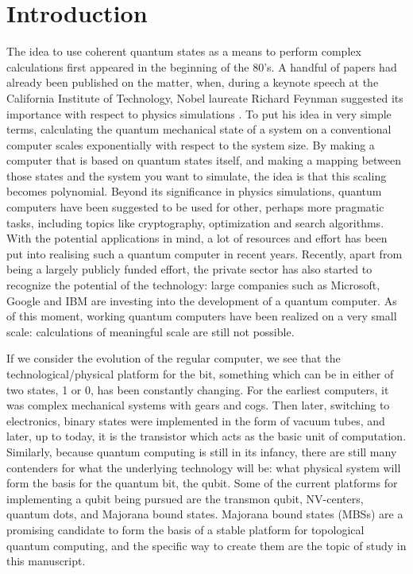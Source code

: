 \chapter{Introduction}

	The idea to use coherent quantum states as a means to perform complex calculations first appeared in the beginning of the 80's.
	A handful of papers had already been published on the matter, when, during a keynote speech at the California Institute of Technology, Nobel laureate Richard Feynman suggested its importance with respect to physics simulations .
	To put his idea in very simple terms, calculating the quantum mechanical state of a system on a conventional computer scales exponentially with respect to the system size.
	By making a computer that is based on quantum states itself, and making a mapping between those states and the system you want to simulate, the idea is that this scaling becomes polynomial.
	Beyond its significance in physics simulations, quantum computers have been suggested to be used for other, perhaps more pragmatic tasks, including topics like cryptography, optimization and search algorithms.
	With the potential applications in mind, a lot of resources and effort has been put into realising such a quantum computer in recent years.
	Recently, apart from being a largely publicly funded effort, the private sector has also started to recognize the potential of the technology: large companies such as Microsoft, Google and IBM are investing into the development of a quantum computer.
	As of this moment, working quantum computers have been realized on a very small scale: calculations of meaningful scale are still not possible.

	If we consider the evolution of the regular computer, we see that the technological/physical platform for the bit, something which can be in either of two states, 1 or 0, has been constantly changing.
	For the earliest computers, it was complex mechanical systems with gears and cogs.
	Then later, switching to electronics, binary states were implemented in the form of vacuum tubes, and later, up to today, it is the transistor which acts as the basic unit of computation.
	Similarly, because quantum computing is still in its infancy, there are still many contenders for what the underlying technology will be: what physical system will form the basis for the quantum bit, the qubit.
	Some of the current platforms for implementing a qubit being pursued are the transmon qubit, NV-centers, quantum dots, and Majorana bound states.
	Majorana bound states (MBSs) are a promising candidate to form the basis of a stable platform for topological quantum computing, and the specific way to create them are the topic of study in this manuscript.

